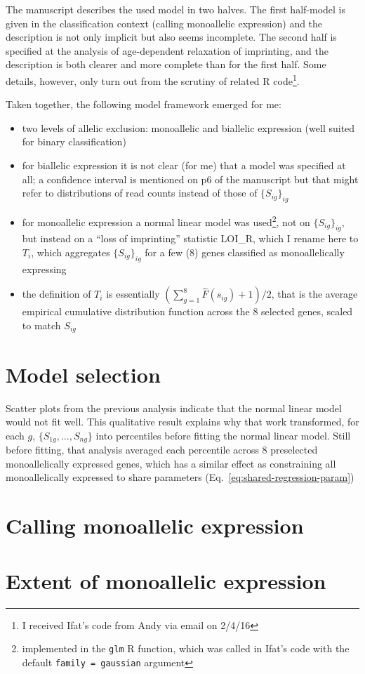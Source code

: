 \documentclass{article}
\begin{document}
The manuscript describes the used model in two halves.  The first half-model is given in the 
classification context (calling monoallelic expression) and the description is not only implicit but
also seems incomplete.  The second half is specified at the analysis of age-dependent relaxation of
imprinting, and the description is both clearer and more complete than for the first half.  Some
details, however, only turn out from the scrutiny of related R code\footnote{I received Ifat's code
from Andy via email on 2/4/16}.

Taken together, the following model framework emerged for me:
\begin{itemize}
\item two levels of allelic exclusion: monoallelic and biallelic expression (well suited for binary classification)
\item for biallelic expression it is not clear (for me) that a model was specified at all;
a confidence interval is mentioned on p6 of the manuscript but that might refer to distributions
of read counts instead of those of \(\{S_{ig}\}_{ig}\)
\item for monoallelic expression a normal linear model was used\footnote{implemented in the
\texttt{glm} R function, which was called in Ifat's code with the default \texttt{family = gaussian}
argument}, not on \(\{S_{ig}\}_{ig}\), but instead on a ``loss of imprinting'' statistic LOI\_R,
which I rename here to \(T_i\), which aggregates \(\{S_{ig}\}_{ig}\) for a few (8) genes classified
as monoallelically expressing
\item the definition of \(T_i\) is essentially \(\left(\sum_{g=1}^8 \hat{F}(s_{ig}) + 1 \right) /
2\), that is the average empirical cumulative distribution function across the 8 selected genes,
scaled to match \(S_{ig}\)
\end{itemize}



\section{Model selection}

Scatter plots from the previous analysis indicate that the normal linear model would not fit well.
This qualitative result explains why that work transformed, for each \(g\),
\(\{S_{1g},...,S_{ng}\}\) into percentiles before fitting the normal linear model.  Still before fitting, that analysis averaged
each percentile across 8 preselected monoallelically expressed genes, which has a similar effect as
constraining all monoallelically expressed to share parameters
(Eq.~\ref{eq:shared-regression-param})

\section{Calling monoallelic expression}

\section{Extent of monoallelic expression}
\end{document}
